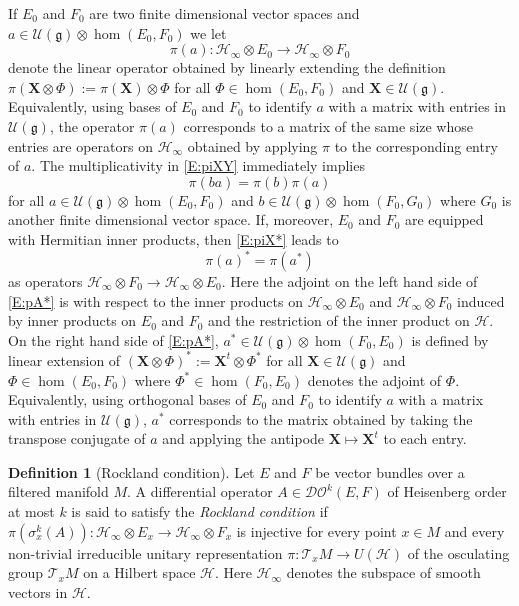\documentclass[reqno,12pt]{amsart}
\newcommand\goe{\mathfrak g}
\newcommand{\DO}{\mathcal D\mathcal O}
\theoremstyle{plain}
\theoremstyle{definition}
\newtheorem{definition}[theorem]{Definition}
\begin{document}
If $E_0$ and $F_0$ are two finite dimensional vector spaces and $a\in\mathcal U(\goe)\otimes\hom(E_0,F_0)$ we let 
$$
\pi(a)\colon\mathcal H_\infty\otimes E_0\to\mathcal H_\infty\otimes F_0
$$ 
denote the linear operator obtained by linearly extending the definition $\pi(\mathbf X\otimes\Phi):=\pi(\mathbf X)\otimes\Phi$ for all $\Phi\in\hom(E_0,F_0)$ and $\mathbf X\in\mathcal U(\goe)$.
Equivalently, using bases of $E_0$ and $F_0$ to identify $a$ with a matrix with entries in $\mathcal U(\goe)$, the operator $\pi(a)$ corresponds to a matrix of the same size whose entries are operators on $\mathcal H_\infty$ obtained by applying $\pi$ to the corresponding entry of $a$.
The multiplicativity in \eqref{E:piXY} immediately implies
\begin{equation}\label{E:pBA}
\pi(ba)=\pi(b)\pi(a)
\end{equation}
for all $a\in\mathcal U(\goe)\otimes\hom(E_0,F_0)$ and $b\in\mathcal U(\goe)\otimes\hom(F_0,G_0)$ where $G_0$ is another finite dimensional vector space.
If, moreover, $E_0$ and $F_0$ are equipped with Hermitian inner products, then \eqref{E:piX*} leads to 
\begin{equation}\label{E:pA*}
\pi(a)^*=\pi(a^*)
\end{equation}
as operators $\mathcal H_\infty\otimes F_0\to\mathcal H_\infty\otimes E_0$.
Here the adjoint on the left hand side of \eqref{E:pA*} is with respect to the inner products on $\mathcal H_\infty\otimes E_0$ and $\mathcal H_\infty\otimes F_0$ induced by inner products on $E_0$ and $F_0$ and the restriction of the inner product on $\mathcal H$.
On the right hand side of \eqref{E:pA*}, $a^*\in\mathcal U(\goe)\otimes\hom(F_0,E_0)$ is defined by linear extension of $(\mathbf X\otimes\Phi)^*:=\mathbf X^t\otimes\Phi^*$ for all $\mathbf X\in\mathcal U(\goe)$ and $\Phi\in\hom(E_0,F_0)$ where $\Phi^*\in\hom(F_0,E_0)$ denotes the adjoint of $\Phi$.
Equivalently, using orthogonal bases of $E_0$ and $F_0$ to identify $a$ with a matrix with entries in $\mathcal U(\goe)$, $a^*$ corresponds to the matrix obtained by taking the transpose conjugate of $a$ and applying the antipode $\mathbf X\mapsto\mathbf X^t$ to each entry.


\begin{definition}[Rockland condition]\label{D:rockland}
Let $E$ and $F$ be vector bundles over a filtered manifold $M$.
A differential operator $A\in\DO^k(E,F)$ of Heisenberg order at most $k$ is said to satisfy the \emph{Rockland condition} if $\pi(\sigma_x^k(A))\colon\mathcal H_\infty\otimes E_x\to\mathcal H_\infty\otimes F_x$ is injective for every point $x\in M$ and every non-trivial irreducible unitary representation $\pi\colon\mathcal T_xM\to U(\mathcal H)$ of the osculating group $\mathcal T_xM$ on a Hilbert space $\mathcal H$.
Here $\mathcal H_\infty$ denotes the subspace of smooth vectors in $\mathcal H$.
\end{definition}
\end{document}
